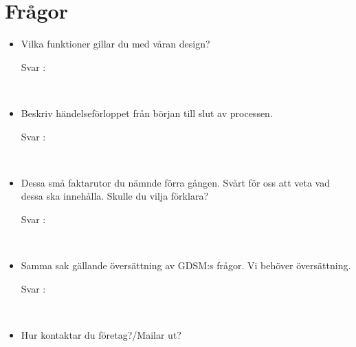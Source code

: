 \documentclass{article}
\date {#1}
\title {
    \documentTitle {Helsingborg Event and Convention Bureau}
    
    \documentDate {}
}
\begin{document}
\maketitle
\thispagestyle{empty}

\newpage




\newpage

\section{Frågor}

 
\begin{itemize}
 \item Vilka funktioner gillar du med våran design?
        \begin{description}
            \item[Svar :]
        \end{description}
    \\
    \item Beskriv händelseförloppet från början till slut av processen.
        \begin{description}
            \item[Svar :]
        \end{description}
    \\
    \item Dessa små faktarutor du nämnde förra gången. Svårt för oss att veta vad dessa ska innehålla. Skulle du vilja förklara?
        \begin{description}
            \item[Svar :]
        \end{description}  
    \\
     \item Samma sak gällande översättning av GDSM:s frågor. Vi behöver översättning. 
        \begin{description}
            \item[Svar :]
        \end{description}
    \\
    \item Hur kontaktar du företag?/Mailar ut?
    

\end{itemize}
\end{document}
